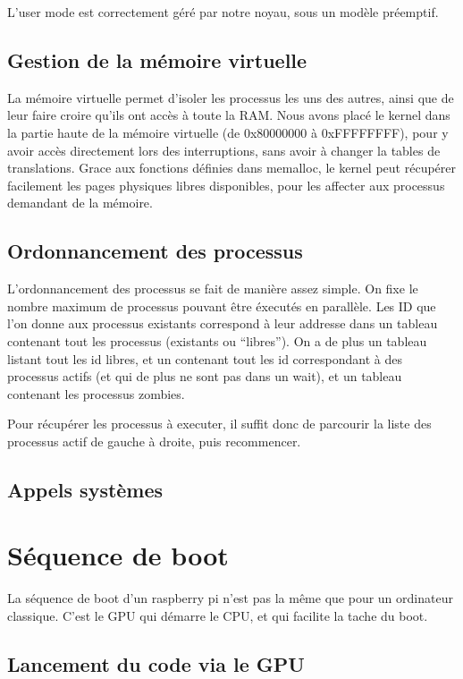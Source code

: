 \documentclass[a4paper]{article}
\begin{document}
L'user mode est correctement géré par notre noyau, sous un modèle préemptif.

\subsection{Gestion de la mémoire virtuelle}

La mémoire virtuelle permet d'isoler les processus les uns des autres, ainsi que
de leur faire croire qu'ils ont accès à toute la RAM. Nous avons placé le kernel
dans la partie haute de la mémoire virtuelle (de 0x80000000 à 0xFFFFFFFF), pour
y avoir accès directement lors des interruptions, sans avoir à changer la tables
de translations. Grace aux fonctions définies dans memalloc, le kernel peut
récupérer facilement les pages physiques libres disponibles, pour les affecter
aux processus demandant de la mémoire.

\subsection{Ordonnancement des processus}

L'ordonnancement des processus se fait de manière assez simple. On fixe le
nombre maximum de processus pouvant être éxecutés en parallèle. Les ID que l'on
donne aux processus existants correspond à leur addresse dans un tableau
contenant tout les processus (existants ou ``libres''). On a de plus un tableau
listant tout les id libres, et un contenant tout les id correspondant à des
processus actifs (et qui de plus ne sont pas dans un wait), et un tableau
contenant les processus zombies.

Pour récupérer les processus à executer, il suffit donc de parcourir la liste
des processus actif de gauche à droite, puis recommencer.

\subsection{Appels systèmes}


\section{Séquence de boot}

La séquence de boot d'un raspberry pi n'est pas la même que pour un ordinateur
classique. C'est le GPU qui démarre le CPU, et qui facilite la tache du boot.

\subsection{Lancement du code via le GPU}
\end{document}
